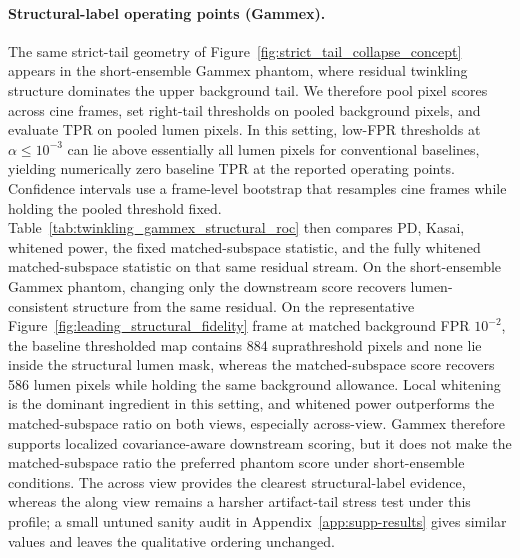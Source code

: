 \documentclass[11pt]{article}
\newif\ifPAPERONLY
\newcommand{\SuppOrApp}[1]{\ifPAPERONLY Supplementary Material\else Appendix~\ref{#1}\fi}
\begin{document}
\paragraph{Structural-label operating points (Gammex).}
The same strict-tail geometry of Figure~\ref{fig:strict_tail_collapse_concept} appears in the short-ensemble Gammex phantom, where residual twinkling structure dominates the upper background tail. We therefore pool pixel scores across cine frames, set right-tail thresholds on pooled background pixels, and evaluate TPR on pooled lumen pixels. In this setting, low-FPR thresholds at $\alpha\le 10^{-3}$ can lie above essentially all lumen pixels for conventional baselines, yielding numerically zero baseline TPR at the reported operating points. Confidence intervals use a frame-level bootstrap that resamples cine frames while holding the pooled threshold fixed. Table~\ref{tab:twinkling_gammex_structural_roc} then compares PD, Kasai, whitened power, the fixed matched-subspace statistic, and the fully whitened matched-subspace statistic on that same residual stream.
On the short-ensemble Gammex phantom, changing only the downstream score recovers lumen-consistent structure from the same residual. On the representative Figure~\ref{fig:leading_structural_fidelity} frame at matched background FPR $10^{-2}$, the baseline thresholded map contains 884 suprathreshold pixels and none lie inside the structural lumen mask, whereas the matched-subspace score recovers 586 lumen pixels while holding the same background allowance. Local whitening is the dominant ingredient in this setting, and whitened power outperforms the matched-subspace ratio on both views, especially across-view. Gammex therefore supports localized covariance-aware downstream scoring, but it does not make the matched-subspace ratio the preferred phantom score under short-ensemble conditions. The across view provides the clearest structural-label evidence, whereas the along view remains a harsher artifact-tail stress test under this profile; a small untuned sanity audit in \SuppOrApp{app:supp-results} gives similar values and leaves the qualitative ordering unchanged.


\end{document}
